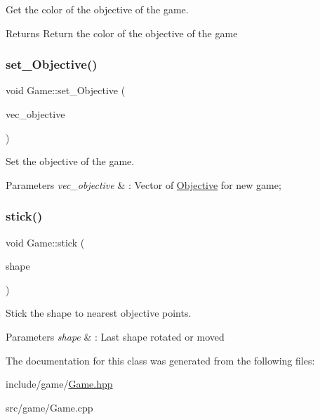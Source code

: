 Get the color of the objective of the game. 

\begin{DoxyReturn}{Returns}
Return the color of the objective of the game 
\end{DoxyReturn}
\mbox{\label{classGame_af8d3ef359625e4179d54f5dd956a0df5}} 
\subsubsection{\texorpdfstring{set\+\_\+\+Objective()}{set\_Objective()}}
{\footnotesize\ttfamily void Game\+::set\+\_\+\+Objective (\begin{DoxyParamCaption}\item[{const std\+::vector$<$ std\+::shared\+\_\+ptr$<$ \hyperlink{classShape}{Shape} $>$$>$ \&}]{vec\+\_\+objective }\end{DoxyParamCaption})}



Set the objective of the game. 


\begin{DoxyParams}{Parameters}
{\em vec\+\_\+objective} & \+: Vector of \hyperlink{classObjective}{Objective} for new game; \\
\hline
\end{DoxyParams}
\mbox{\label{classGame_a54ea3746d3738423197219af2d508188}} 
\subsubsection{\texorpdfstring{stick()}{stick()}}
{\footnotesize\ttfamily void Game\+::stick (\begin{DoxyParamCaption}\item[{const std\+::shared\+\_\+ptr$<$ \hyperlink{classShape}{Shape} $>$ \&}]{shape }\end{DoxyParamCaption})}



Stick the shape to nearest objective points. 


\begin{DoxyParams}{Parameters}
{\em shape} & \+: Last shape rotated or moved \\
\hline
\end{DoxyParams}


The documentation for this class was generated from the following files\+:\begin{DoxyCompactItemize}
\item 
include/game/\hyperlink{Game_8hpp}{Game.\+hpp}\item 
src/game/Game.\+cpp\end{DoxyCompactItemize}
